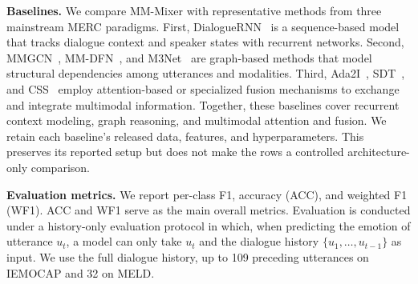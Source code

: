 \documentclass[letterpaper]{article} %
\begin{document}
\noindent\textbf{Baselines.}
We compare MM-Mixer with representative methods from three mainstream
MERC paradigms. First, DialogueRNN~\cite{dialoguernn} is a sequence-based model that tracks dialogue context and speaker states with recurrent networks. Second, MMGCN~\cite{mmgcn},
MM-DFN~\cite{mmdfn}, and M3Net~\cite{m3net} are graph-based methods that model structural dependencies among utterances and modalities. Third, Ada2I~\cite{ada2i}, SDT~\cite{sdt}, and CSS~\cite{css} employ attention-based or specialized fusion mechanisms to exchange and
integrate multimodal information. Together, these baselines cover recurrent context modeling, graph reasoning, and multimodal attention and fusion. We retain each baseline's released data, features, and hyperparameters. This preserves its reported setup but does not make the rows a controlled architecture-only comparison.

\noindent\textbf{Evaluation metrics.}
We report per-class F1, accuracy (ACC), and weighted F1 (WF1). ACC and WF1 serve as the main overall metrics. Evaluation is conducted under a history-only evaluation protocol in which, when predicting the emotion of utterance $u_t$, a model can only take  $u_{t}$ and
the dialogue history $\{u_1,\ldots,u_{t-1}\}$ as input.
We use the full dialogue history, up to 109 preceding utterances on
IEMOCAP and 32 on MELD.
\end{document}
